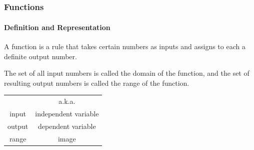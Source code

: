 \documentclass[9pt,xcolor=x11names,compress]{beamer}
\begin{document}
\subsection{}

\begin{frame}[c]\frametitle{Functions}
    
\framesubtitle{Definition and Representation}

\begin{definition}
A \alert{function} is a rule that takes certain numbers as inputs and assigns to each a definite output number.

\pause The set of all input numbers is called the \alert{domain} of the function, and the set of resulting output numbers is called the \alert{range} of the function.
\end{definition}

\pause
\begin{center}
	\begin{tabular}{c||c}	
		\rowcolor{DeepSkyBlue4}	
		 & a.k.a. \\
		input & \alert{independent variable} \\
		output & \alert{dependent variable} \\
		range & \alert{image}
	\end{tabular}
\end{center}

\pause


\end{frame}
\end{document}
